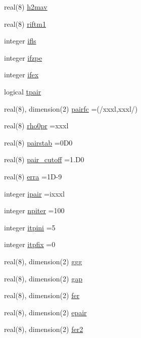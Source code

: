 \begin{DoxyCompactItemize}
real(8) \hyperlink{namespacedynpar_ac33de9cee1beb56a87e03deca2c70612}{h2mav}
\item 
real(8) \hyperlink{namespacedynpar_a5a55fded8acc95ce6310835c6917bb99}{riftm1}
\item 
integer \hyperlink{namespacedynpar_a877470f2bcded7acda67b5c1cf9cca5c}{ifls}
\item 
integer \hyperlink{namespacedynpar_a775e5f5a73d95413b3060b3a3416d348}{ifzpe}
\item 
integer \hyperlink{namespacedynpar_a3d674134cccc9169245f519211dd8cd3}{ifex}
\item 
logical \hyperlink{namespacedynpar_ae803e7e68e03a3afec51fc221aec9378}{tpair}
\item 
real(8), dimension(2) \hyperlink{namespacedynpar_a851f888a2f9b400221d64c48005cb36a}{pairfc} =(/xxxl,xxxl/)
\item 
real(8) \hyperlink{namespacedynpar_a14f4c76bd326e0be0d0b847314f439b9}{rho0pr} =xxxl
\item 
real(8) \hyperlink{namespacedynpar_a4b2ad788ede529a0aa5eb57e0d0af8ce}{pairstab} =0\+D0
\item 
real(8) \hyperlink{namespacedynpar_a9c3f1f575ac40a6f77dc8fe0b25b7de9}{pair\+\_\+cutoff} =1.\+D0
\item 
real(8) \hyperlink{namespacedynpar_acfc09d77f0f8e8c7d7e8d35ba37d1183}{erra} =1\+D-\/9
\item 
integer \hyperlink{namespacedynpar_a121a312e57301749fe811c37a646ffa7}{ipair} =ixxxl
\item 
integer \hyperlink{namespacedynpar_aff25205e0d3d27dd13d9018690705300}{npiter} =100
\item 
integer \hyperlink{namespacedynpar_afe6486ebd1f5ec51b5bd80422ee2bf9a}{itpini} =5
\item 
integer \hyperlink{namespacedynpar_ad7ea186e7f9cdd4eeef2e37658dc4ec5}{itpfix} =0
\item 
real(8), dimension(2) \hyperlink{namespacedynpar_a853bf04735807d2246a44c27a2cc0525}{ggg}
\item 
real(8), dimension(2) \hyperlink{namespacedynpar_a35d2d18fbc60955048c9bd94d877fe33}{gap}
\item 
real(8), dimension(2) \hyperlink{namespacedynpar_ad192a883caa277e6894248778b09dc2d}{fer}
\item 
real(8), dimension(2) \hyperlink{namespacedynpar_ac04788950822d4daab61ae4a7aa49e6f}{epair}
\item 
real(8), dimension(2) \hyperlink{namespacedynpar_ac8bb49a0c3ecc099232039bfc9eacf7b}{fer2}
\item 

\end{DoxyCompactItemize}
